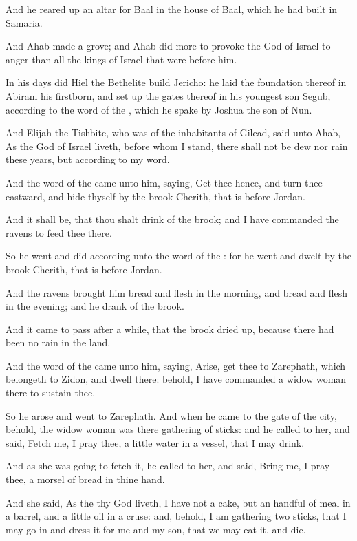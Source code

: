 \Verse And he reared up an altar for Baal in the house of Baal, which he had built in Samaria.

\Verse And Ahab made a grove; and Ahab did more to provoke the \LORD God of Israel to anger than all the kings of Israel that were before him.

\Verse In his days did Hiel the Bethelite build Jericho: he laid the foundation thereof in Abiram his firstborn, and set up the gates thereof in his youngest son Segub, according to the word of the \LORD, which he spake by Joshua the son of Nun.


\Chapter
\Verse And Elijah the Tishbite, who was of the inhabitants of Gilead, said unto Ahab, As the \LORD God of Israel liveth, before whom I stand, there shall not be dew nor rain these years, but according to my word.

\Verse And the word of the \LORD came unto him, saying, \Verse Get thee hence, and turn thee eastward, and hide thyself by the brook Cherith, that is before Jordan.

\Verse And it shall be, that thou shalt drink of the brook; and I have commanded the ravens to feed thee there.

\Verse So he went and did according unto the word of the \LORD: for he went and dwelt by the brook Cherith, that is before Jordan.

\Verse And the ravens brought him bread and flesh in the morning, and bread and flesh in the evening; and he drank of the brook.

\Verse And it came to pass after a while, that the brook dried up, because there had been no rain in the land.

\Verse And the word of the \LORD came unto him, saying, \Verse Arise, get thee to Zarephath, which belongeth to Zidon, and dwell there: behold, I have commanded a widow woman there to sustain thee.

\Verse So he arose and went to Zarephath. And when he came to the gate of the city, behold, the widow woman was there gathering of sticks: and he called to her, and said, Fetch me, I pray thee, a little water in a vessel, that I may drink.

\Verse And as she was going to fetch it, he called to her, and said, Bring me, I pray thee, a morsel of bread in thine hand.

\Verse And she said, As the \LORD thy God liveth, I have not a cake, but an handful of meal in a barrel, and a little oil in a cruse: and, behold, I am gathering two sticks, that I may go in and dress it for me and my son, that we may eat it, and die.

